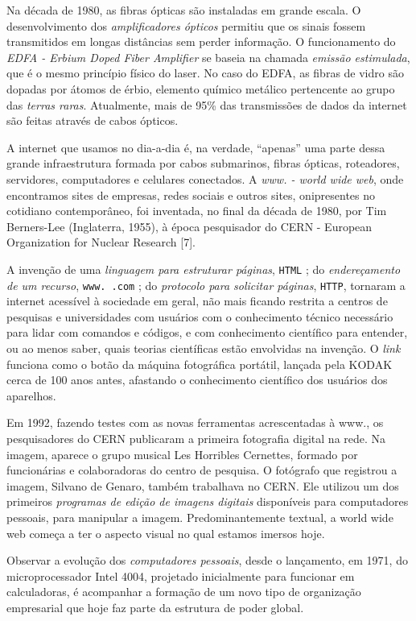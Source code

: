 \documentclass{hipatia}
\begin{document}
Na década de 1980, as fibras ópticas são instaladas em grande escala. O desenvolvimento dos \textit{amplificadores ópticos} permitiu que os sinais fossem transmitidos em longas distâncias sem perder informação. O funcionamento do \textit{EDFA - Erbium Doped Fiber Amplifier} se baseia na chamada \textit{emissão estimulada}, que é o mesmo princípio físico do laser. No caso do EDFA, as fibras de vidro são dopadas por átomos de érbio, elemento químico metálico pertencente ao grupo das \textit{terras raras}. Atualmente, mais de 95\% das transmissões de dados da internet são feitas através de cabos ópticos.

A internet que usamos no dia-a-dia é, na verdade, ``apenas'' uma parte dessa grande infraestrutura formada por cabos submarinos, fibras ópticas, roteadores, servidores, computadores e celulares conectados. A \textit{www. - world wide web}, onde encontramos sites de empresas, redes sociais e outros sites, onipresentes no cotidiano contemporâneo, foi inventada, no final da década de 1980, por Tim Berners-Lee (Inglaterra, 1955), à época pesquisador do CERN - European Organization for Nuclear Research [7].

A invenção de uma \textit{linguagem para estruturar páginas}, \verb|HTML| ; do \textit{endereçamento de um recurso}, \verb|www. .com| ; do \textit{protocolo para solicitar páginas}, \verb|HTTP|, tornaram a internet acessível à sociedade em geral, não mais ficando restrita a centros de pesquisas e universidades com usuários com o conhecimento técnico necessário para lidar com comandos e códigos, e com conhecimento científico para entender, ou ao menos saber, quais teorias científicas estão envolvidas na invenção. O \textit{link} funciona como o botão da máquina fotográfica portátil, lançada pela KODAK cerca de 100 anos antes, afastando o conhecimento científico dos usuários dos aparelhos.

Em 1992, fazendo testes com as novas ferramentas acrescentadas à www., os pesquisadores do CERN publicaram a primeira fotografia digital na rede. Na imagem, aparece o grupo musical Les Horribles Cernettes, formado por funcionárias e colaboradoras do centro de pesquisa. O fotógrafo que registrou a imagem, Silvano de Genaro, também trabalhava no CERN. Ele utilizou um dos primeiros \textit{programas de edição de imagens digitais} disponíveis para computadores pessoais, para manipular a imagem. Predominantemente textual, a world wide web começa a ter o aspecto visual no qual estamos imersos hoje.

Observar a evolução dos \textit{computadores pessoais}, desde o lançamento, em 1971, do microprocessador Intel 4004, projetado inicialmente para funcionar em calculadoras, é acompanhar a formação de um novo tipo de organização empresarial que hoje faz parte da estrutura de poder global.
\end{document}
